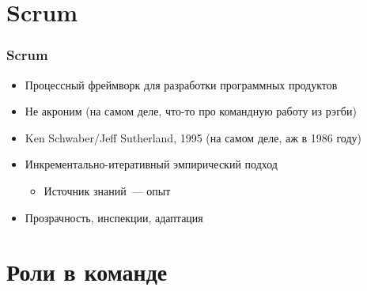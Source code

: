 \documentclass{../../slides-style}
\begin{document}
    \begin{frame}[plain]
        \titlepage
    \end{frame}

    \section{Scrum}

    \begin{frame}
        \frametitle{Scrum}
        \begin{itemize}
            \item Процессный фреймворк для разработки программных продуктов
            \item Не акроним (на самом деле, что-то про командную работу из рэгби)
            \item Ken Schwaber/Jeff Sutherland, 1995 (на самом деле, аж в 1986 году)
            \item Инкрементально-итеративный эмпирический подход
            \begin{itemize}
                \item Источник знаний~--- опыт
            \end{itemize}
            \item Прозрачность, инспекции, адаптация
        \end{itemize}
    \end{frame}

    \section{Роли в команде}
\end{document}
